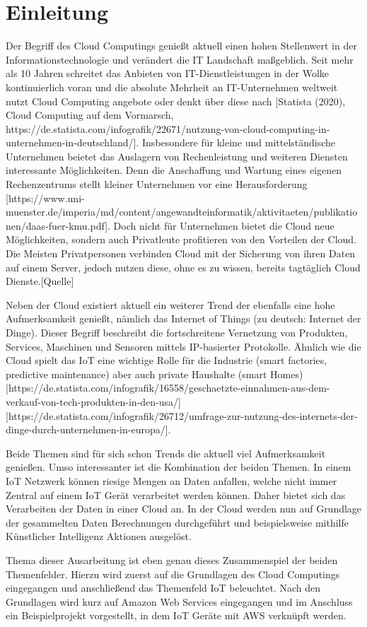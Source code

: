\chapter{Einleitung}\label{ch:1}

Der Begriff des Cloud Computings genießt aktuell einen hohen Stellenwert in der Informationstechnologie und verändert die IT Landschaft maßgeblich. Seit mehr als 10 Jahren schreitet das Anbieten von IT-Dienstleistungen in der Wolke kontinuierlich voran und die absolute Mehrheit an IT-Unternehmen weltweit nutzt Cloud Computing angebote oder denkt über diese nach [Statista (2020), Cloud Computing auf dem Vormarsch, https://de.statista.com/infografik/22671/nutzung-von-cloud-computing-in-unternehmen-in-deutschland/]. Insbesondere für kleine und mittelständische Unternehmen beietet das Auslagern von Rechenleistung und weiteren Diensten interessante Möglichkeiten. Denn die Anschaffung und Wartung eines eigenen Rechenzentrums stellt kleiner Unternehmen vor eine Herausforderung [https://www.uni-muenster.de/imperia/md/content/angewandteinformatik/aktivitaeten/publikationen/daas-fuer-kmu.pdf]. Doch nicht für Unternehmen bietet die Cloud neue Möglichkeiten, sondern auch Privatleute profitieren von den Vorteilen der Cloud. Die Meisten Privatpersonen verbinden Cloud mit der Sicherung von ihren Daten auf einem Server, jedoch nutzen diese, ohne es zu wissen, bereits tagtäglich Cloud Dienste.[Quelle] 

Neben der Cloud existiert aktuell ein weiterer Trend der ebenfalls eine hohe Aufmerksamkeit genießt, nämlich das Internet of Things (zu deutsch: Internet der Dinge). Dieser Begriff beschreibt die fortschreitene Vernetzung von Produkten, Services, Maschinen und Sensoren mittels IP-basierter Protokolle. Ähnlich wie die Cloud spielt das IoT eine wichtige Rolle für die Industrie (smart factories, predictive maintenance) aber auch private Haushalte (smart Homes) [https://de.statista.com/infografik/16558/geschaetzte-einnahmen-aus-dem-verkauf-von-tech-produkten-in-den-usa/][https://de.statista.com/infografik/26712/umfrage-zur-nutzung-des-internets-der-dinge-durch-unternehmen-in-europa/]. 

Beide Themen sind für sich schon Trends die aktuell viel Aufmerksamkeit genießen. Umso interessanter ist die Kombination der beiden Themen. In einem IoT Netzwerk können riesige Mengen an Daten anfallen, welche nicht immer Zentral auf einem IoT Gerät verarbeitet werden können. Daher bietet sich das Verarbeiten der Daten in einer Cloud an. In der Cloud werden nun auf Grundlage der gesammelten Daten Berechnungen durchgeführt und beispielsweise mithilfe Künstlicher Intelligenz Aktionen ausgelöst. 

Thema dieser Ausarbeitung ist eben genau dieses Zusammenspiel der beiden Themenfelder. Hierzu wird zuerst auf die Grundlagen des Cloud Computings eingegangen und anschließend das Themenfeld IoT beleuchtet. Nach den Grundlagen wird kurz auf Amazon Web Services eingegangen und im Anschluss ein Beispielprojekt vorgestellt, in dem IoT Geräte mit AWS verknüpft werden.  
     